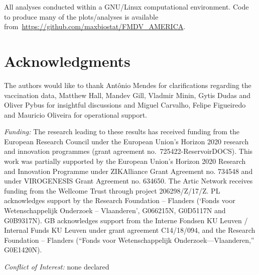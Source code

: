 \documentclass[10pt]{article}
\begin{document}
All analyses conducted within a GNU/Linux computational environment.
Code to produce many of the plots/analyses is available from~\url{https://github.com/maxbiostat/FMDV_AMERICA}.

\section*{Acknowledgments}
The authors would like to thank Ant\^onio Mendes for clarifications regarding the vaccination data, Matthew Hall, Mandev Gill, Vladmir Minin, Gytis Dudas and Oliver Pybus for insightful discussions and Miguel Carvalho, Felipe Figueiredo and Mauricio Oliveira for operational support.

\emph{Funding:} %
The research leading to these results has received funding from the European Research Council under the European Union's Horizon 2020 research and innovation programmes (grant agreement no.~725422-ReservoirDOCS).
This work was partially supported by the European Union's Horizon 2020 Research and Innovation Programme under ZIKAlliance Grant Agreement no. 734548 and under VIROGENESIS Grant Agreement no. 634650.
The Artic Network receives funding from the Wellcome Trust through project 206298/Z/17/Z.
PL acknowledges support by the Research Foundation -- Flanders (`Fonds voor Wetenschappelijk Onderzoek -- Vlaanderen', G066215N, G0D5117N and G0B9317N). 
GB acknowledges support from the Interne Fondsen KU Leuven / Internal Funds KU Leuven under grant agreement C14/18/094, and the Research Foundation -- Flanders (``Fonds voor Wetenschappelijk Onderzoek—Vlaanderen,'' G0E1420N).


\emph{Conflict of Interest:} none declared
\end{document}
